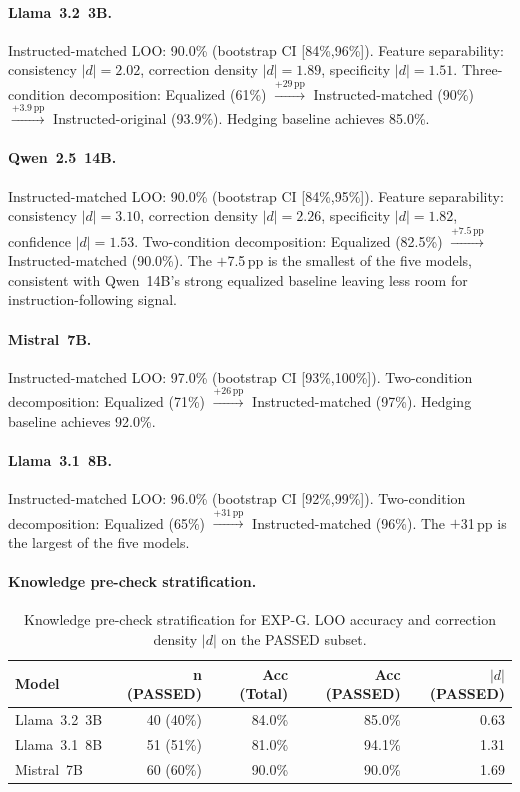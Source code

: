 \paragraph{Llama~3.2~3B.}
Instructed-matched LOO: 90.0\% (bootstrap CI [84\%,96\%]). Feature separability: consistency $|d|=2.02$, correction density $|d|=1.89$, specificity $|d|=1.51$. Three-condition decomposition: Equalized (61\%) $\xrightarrow{+29\,\text{pp}}$ Instructed-matched (90\%) $\xrightarrow{+3.9\,\text{pp}}$ Instructed-original (93.9\%). Hedging baseline achieves 85.0\%.

\paragraph{Qwen~2.5~14B.}
Instructed-matched LOO: 90.0\% (bootstrap CI [84\%,95\%]). Feature separability: consistency $|d|=3.10$, correction density $|d|=2.26$, specificity $|d|=1.82$, confidence $|d|=1.53$. Two-condition decomposition: Equalized (82.5\%) $\xrightarrow{+7.5\,\text{pp}}$ Instructed-matched (90.0\%). The $+$7.5\,pp is the smallest of the five models, consistent with Qwen~14B's strong equalized baseline leaving less room for instruction-following signal.

\paragraph{Mistral~7B.}
Instructed-matched LOO: 97.0\% (bootstrap CI [93\%,100\%]). Two-condition decomposition: Equalized (71\%) $\xrightarrow{+26\,\text{pp}}$ Instructed-matched (97\%). Hedging baseline achieves 92.0\%.

\paragraph{Llama~3.1~8B.}
Instructed-matched LOO: 96.0\% (bootstrap CI [92\%,99\%]). Two-condition decomposition: Equalized (65\%) $\xrightarrow{+31\,\text{pp}}$ Instructed-matched (96\%). The $+$31\,pp is the largest of the five models.

\paragraph{Knowledge pre-check stratification.}

\begin{table}[h]
\centering
\caption{Knowledge pre-check stratification for EXP-G. LOO accuracy and correction density $|d|$ on the PASSED subset.}
\label{tab:knowledge_precheck_stratified}
\begin{tabular}{lrrrr}
\toprule
\textbf{Model} & \textbf{n (PASSED)} & \textbf{Acc (Total)} & \textbf{Acc (PASSED)} & \textbf{$|d|$ (PASSED)} \\
\midrule
Llama~3.2~3B  & 40 (40\%)  & 84.0\% & 85.0\% & 0.63 \\
Llama~3.1~8B  & 51 (51\%)  & 81.0\% & 94.1\% & 1.31 \\
Mistral~7B    & 60 (60\%)  & 90.0\% & 90.0\% & 1.69 \\
\bottomrule
\end{tabular}
\end{table}

